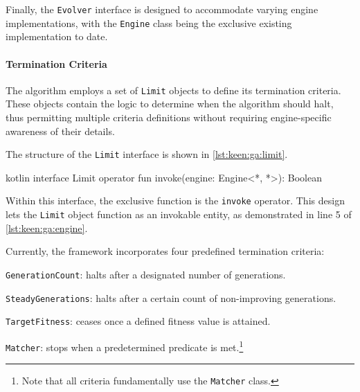   Finally, the \texttt{Evolver} interface is designed to accommodate varying 
  engine implementations, with the \texttt{Engine} class being the exclusive 
  existing implementation to date.

  \paragraph{Termination Criteria}
    The algorithm employs a set of \texttt{Limit} objects to define its 
    termination criteria.
    These objects contain the logic to determine when the algorithm should halt, 
    thus permitting multiple criteria definitions without requiring 
    engine-specific awareness of their details.

    The structure of the \texttt{Limit} interface is shown in 
    \vref{lst:keen:ga:limit}.

    \begin{code}{kotlin}
      interface Limit {
          operator fun invoke(engine: Engine<*, *>): Boolean
      }
    \end{code}

    Within this interface, the exclusive function is the \texttt{invoke} 
    operator.
    This design lets the \texttt{Limit} object function as an invokable entity, 
    as demonstrated in line 5 of \vref{lst:keen:ga:engine}.

    Currently, the framework incorporates four predefined termination criteria:
    \begin{enumerate*}
      \item \texttt{GenerationCount}: halts after a designated number of 
        generations.
      \item \texttt{SteadyGenerations}: halts after a certain count of 
        non-improving generations.
      \item \texttt{TargetFitness}: ceases once a defined fitness value is 
        attained.
      \item \texttt{Matcher}: stops when a predetermined predicate is 
        met.\footnote{
          Note that all criteria fundamentally use the \texttt{Matcher} class.
        }
    \end{enumerate*}
